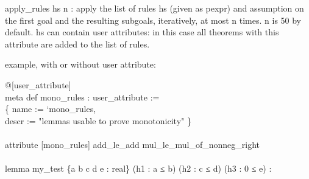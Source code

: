 \documentclass{article}
\begin{document}
\colorbox[RGB]{253,246,227}{{{{\color[RGB]{101, 123, 131} apply\_rules hs n }}}}: apply the list of rules 
\colorbox[RGB]{253,246,227}{{{{\color[RGB]{101, 123, 131} hs }}}} (given as pexpr) and 
\colorbox[RGB]{253,246,227}{{{{\color[RGB]{101, 123, 131} assumption }}}} on the
first goal and the resulting subgoals, iteratively, at most 
\colorbox[RGB]{253,246,227}{{{{\color[RGB]{101, 123, 131} n }}}} times.
\colorbox[RGB]{253,246,227}{{{{\color[RGB]{101, 123, 131} n }}}} is 50 by default. 
\colorbox[RGB]{253,246,227}{{{{\color[RGB]{101, 123, 131} hs }}}} can contain user attributes: in this case all theorems with this
attribute are added to the list of rules.
\par
example, with or without user attribute:
\\
\colorbox[RGB]{253,246,227}{\parbox{4.5in}{{{{\color[RGB]{88, 110, 117} @{[}user\_attribute{]} }}}{{{\color[RGB]{101, 123, 131} 
 }}}\\
{{{\color[RGB]{133, 153, 0} meta }}}{{{\color[RGB]{101, 123, 131}   }}}{{{\color[RGB]{133, 153, 0} def }}}{{{\color[RGB]{101, 123, 131}   }}}{{{\color[RGB]{211, 54, 130} mono\_rules }}}{{{\color[RGB]{101, 123, 131}   }}}{{{\color[RGB]{101, 123, 131} : user\_attribute  }}}{{{\color[RGB]{181, 137, 0} := }}}{{{\color[RGB]{101, 123, 131} 
 }}}\\
{{{\color[RGB]{101, 123, 131} \{ name  }}}{{{\color[RGB]{181, 137, 0} := }}}{{{\color[RGB]{101, 123, 131}  `mono\_rules,
 }}}\\
{{{\color[RGB]{101, 123, 131}   descr  }}}{{{\color[RGB]{181, 137, 0} := }}}{{{\color[RGB]{101, 123, 131}   }}}{{{\color[RGB]{42, 161, 152} "lemmas usable to prove monotonicity" }}}{{{\color[RGB]{101, 123, 131}  \}
 }}}\\
{{{\color[RGB]{101, 123, 131} 
 }}}\\
{{{\color[RGB]{88, 110, 117} attribute {[}mono\_rules{]} }}}{{{\color[RGB]{101, 123, 131}  add\_le\_add mul\_le\_mul\_of\_nonneg\_right
 }}}\\
{{{\color[RGB]{101, 123, 131} 
 }}}\\
{{{\color[RGB]{133, 153, 0} lemma }}}{{{\color[RGB]{101, 123, 131}   }}}{{{\color[RGB]{211, 54, 130} my\_test }}}{{{\color[RGB]{101, 123, 131}   }}}{{{\color[RGB]{101, 123, 131} \{a b c d e : real\} (h1 : a  }}}{{{\color[RGB]{181, 137, 0} ≤ }}}{{{\color[RGB]{101, 123, 131}  b) (h2 : c  }}}{{{\color[RGB]{181, 137, 0} ≤ }}}{{{\color[RGB]{101, 123, 131}  d) (h3 :  }}}{{{\color[RGB]{108, 113, 196} 0 }}}{{{\color[RGB]{101, 123, 131}   }}}{{{\color[RGB]{181, 137, 0} ≤ }}}{{{\color[RGB]{101, 123, 131}  e) :
}}}}}
\end{document}
